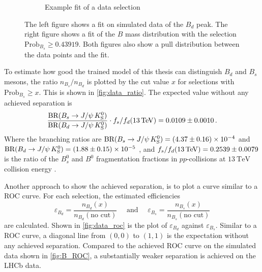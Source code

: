 \begin{figure}
\begin{subfigure}{0.5\textwidth}
        \caption{Example fit of a data selection}
        \label{fig:fit_example}
    \end{subfigure}%
    \caption{The left figure shows a fit on simulated data of the $B_d$ peak. The right figure shows a fit of the $B$ mass distribution with the selection $\text{Prob}_{B_s} \geq 0.43919$. Both figures also show a pull distribution between the data points and the fit.}
\end{figure}

To estimate how good the trained model of this thesis can distinguish $B_d$ and $B_s$ mesons, the ratio $n_{B_s}/n_{B_d}$ is plotted by the cut value $x$ for selections with $\text{Prob}_{B_s} \geq x$. 
This is shown in \cref{fig:data_ratio}.
The expected value without any achieved separation is 
\begin{equation}
    \frac{\text{BR}(B_s \rightarrow J/\psi \, K^0_\text{S})}{\text{BR}(B_d \rightarrow J/\psi \, K^0_\text{S})} \cdot 
    f_s/f_d(\qty{13}{\TeV}) = \num{0.0109\pm0.0010} \, .
\end{equation}
Where the branching ratios are $\text{BR}(B_s \rightarrow J/\psi \, K^0_\text{S}) = \num{4.37\pm0.16e-4}$ and $\text{BR}(B_d \rightarrow J/\psi \, K^0_\text{S}) = \num{1.88\pm0.15e-5}$ \cite{pdg}, and $f_s/f_d(\qty{13}{\TeV}) = \num{0.2539\pm0.0079}$ is the ratio of the $B^0_s$ and $B^0$ fragmentation fractions in $pp$-collisions at $\qty{13}{\TeV}$ collision energy \cite{fsfd}.

Another approach to show the achieved separation, is to plot a curve similar to a ROC curve. 
For each selection, the estimated efficiencies
\begin{equation}
    \varepsilon_{B_d} = \frac{n_{B_d}(x)}{n_{B_d}(\text{no cut})} \quad\text{ and }\quad \varepsilon_{B_s} = \frac{n_{B_s}(x)}{n_{B_s}(\text{no cut})}
\end{equation}
are calculated. Shown in \cref{fig:data_roc} is the plot of $\varepsilon_{B_d}$ against $\varepsilon_{B_s}$.
Similar to a ROC curve, a diagonal line from $(0,0)$ to $(1,1)$ is the expectation without any achieved separation.
Compared to the achieved ROC curve on the simulated data shown in \cref{fig:B_ROC}, a substantially weaker separation is achieved on the LHCb data.

